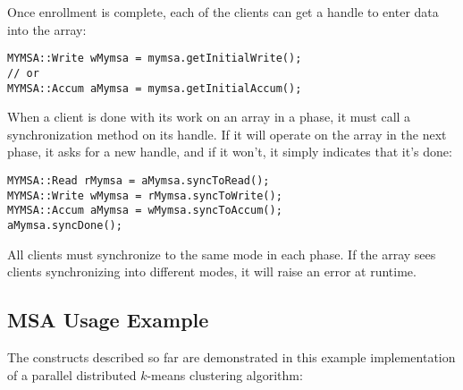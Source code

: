 Once enrollment is complete, each of the clients can get a handle to
enter data into the array:
\begin{verbatim}
MYMSA::Write wMymsa = mymsa.getInitialWrite();
// or
MYMSA::Accum aMymsa = mymsa.getInitialAccum();
\end{verbatim}

When a client is done with its work on an array in a phase, it must
call a synchronization method on its handle. If it will operate on the
array in the next phase, it asks for a new handle, and if it won't, it
simply indicates that it's done:
\begin{verbatim}
MYMSA::Read rMymsa = aMymsa.syncToRead();
MYMSA::Write wMymsa = rMymsa.syncToWrite();
MYMSA::Accum aMymsa = wMymsa.syncToAccum();
aMymsa.syncDone();
\end{verbatim}
All clients must synchronize to the same mode in each phase. If the
array sees clients synchronizing into different modes, it will raise
an error at runtime.

\subsection{MSA Usage Example}

The constructs described so far are demonstrated in this example
implementation of a parallel distributed $k$-means clustering
algorithm:



